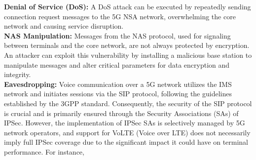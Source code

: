\documentclass[english]{article}
\begin{document}
\textbf{Denial of Service (DoS):} A DoS attack can be executed by repeatedly sending
connection request messages to the 5G NSA network, overwhelming the core network and
causing service disruption.
\\[0.2cm]
\textbf{NAS Manipulation:} Messages from the NAS protocol, used for signaling between
terminals and the core network, are not always protected by encryption. An attacker
can exploit this vulnerability by installing a malicious base station to manipulate
messages and alter critical parameters for data encryption and integrity.
\\[0.2cm]
\textbf{Eavesdropping:} Voice communication over a 5G network utilizes the IMS
network and initiates sessions via the SIP protocol, following the guidelines
established by the 3GPP standard. Consequently, the security of the SIP protocol
is crucial and is primarily ensured through the Security Associations (SAs) of IPSec.
However, the implementation of IPSec SAs is selectively managed by 5G network operators,
and support for VoLTE (Voice over LTE) does not necessarily imply full IPSec coverage
due to the significant impact it could have on terminal performance. For instance,
\end{document}
